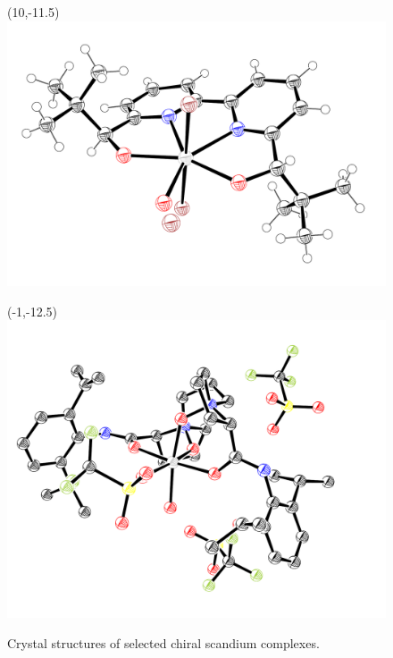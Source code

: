 \begin{figure}[p]
   \begin{textblock}{1}(10,-11.5)
   \includegraphics[scale=0.3]{chp_asymmetric/images/kobayashibromideortep}\end{textblock}
    \begin{textblock}{1}(-1,-12.5)
  \includegraphics[scale=0.35]{chp_asymmetric/images/fengoxideortep}\end{textblock}
  \vspace{0.3in}
  \caption{Crystal structures of selected chiral scandium complexes.}
  \label{fig:xraypage}
  \end{figure}
 
